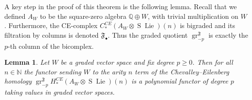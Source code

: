 \documentclass[12pt]{article}
\newcommand{\N}{\mathbb{N}}
\newcommand{\Q}{\mathbb{Q}}
\DeclareMathOperator{\gr}{gr}
\DeclareMathOperator{\Lie}{Lie}
\DeclareMathOperator{\Suspension}{S}
\theoremstyle{plain}
\newtheorem{lem}[thm]{Lemma}
\theoremstyle{definition}
\theoremstyle{remark}
\begin{document}
A key step in the proof of this theorem is the following lemma. Recall that we defined $A_W$ to be the square-zero algebra $\Q\oplus W$, with trivial multiplication on $W$. Furthermore, the CE-complex $C^{CE}_*(A_W\otimes \Suspension\Lie)(n)$ is bigraded and its filtration by columns is denoted $\mathfrak{F}_{\bullet}$. Thus the graded quotient $\gr^{\mathfrak{F}}_{-p}$ is exactly the $p$-th column of the bicomplex.


\begin{lem}
Let $W$ be a graded vector space and fix degree $p\geq 0$. Then for all $n\in \N$ the functor sending $W$ to the arity $n$ term of the Chevalley--Eilenberg homology $\gr_{-p}^{\mathfrak{F}} H^{CE}_{\ast}(A_W\otimes\Suspension\Lie)(n)$ is a polynomial functor of degree $p$ taking values in graded vector spaces. %

\end{lem}
\end{document}
